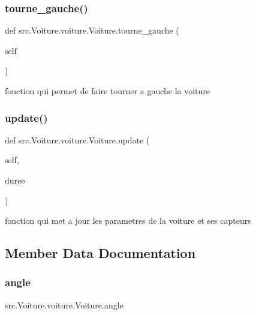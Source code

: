 \subsubsection{\texorpdfstring{tourne\+\_\+gauche()}{tourne\_gauche()}}
{\footnotesize\ttfamily def src.\+Voiture.\+voiture.\+Voiture.\+tourne\+\_\+gauche (\begin{DoxyParamCaption}\item[{}]{self }\end{DoxyParamCaption})}



fonction qui permet de faire tourner a gauche la voiture 

\mbox{\label{classsrc_1_1_voiture_1_1voiture_1_1_voiture_aacae4707fab946e85c1a4599f920dd47}} 
\subsubsection{\texorpdfstring{update()}{update()}}
{\footnotesize\ttfamily def src.\+Voiture.\+voiture.\+Voiture.\+update (\begin{DoxyParamCaption}\item[{}]{self,  }\item[{}]{duree }\end{DoxyParamCaption})}



fonction qui met a jour les parametres de la voiture et ses capteurs 



\subsection{Member Data Documentation}
\mbox{\label{classsrc_1_1_voiture_1_1voiture_1_1_voiture_a808deb309ce297eb0493e9f6239a2e23}} 
\subsubsection{\texorpdfstring{angle}{angle}}
{\footnotesize\ttfamily src.\+Voiture.\+voiture.\+Voiture.\+angle}



